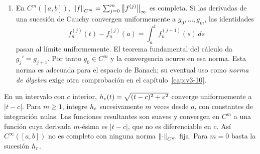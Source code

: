\begin{enumerate}
\item En $C^m([a,b])$, $\left\lVert f\right\rVert_{C^m}=\sum_{j=0}^m\left\lVert f^{(j)}\right\rVert_\infty$ es completa. Si las derivadas de una sucesión de Cauchy convergen uniformemente a $g_0,\ldots,g_m$, las identidades
\[
 f_n^{(j)}(t)-f_n^{(j)}(a)=\int_a^t f_n^{(j+1)}(s)\,ds
\]
pasan al límite uniformemente. El teorema fundamental del cálculo da $g_j'=g_{j+1}$. Por tanto $g_0\in C^m$ y la convergencia ocurre en esa norma. Esta norma es adecuada para el espacio de Banach; su eventual uso como \emph{norma de álgebra} exige otra comprobación en el capítulo~\ref{cap:v3-10}.
\end{enumerate}
\begin{ejemplo}
En un intervalo con $c$ interior, $h_\varepsilon(t)=\sqrt{(t-c)^2+\varepsilon^2}$ converge uniformemente a $|t-c|$. Para $m\geq1$, integre $h_\varepsilon$ sucesivamente $m$ veces desde $a$, con constantes de integración nulas. Las funciones resultantes son suaves y convergen en $C^m$ a una función cuya derivada $m$-ésima es $|t-c|$, que no es diferenciable en $c$. Así $C^\infty([a,b])$ no es completo con ninguna norma $\left\lVert\cdot\right\rVert_{C^m}$ fija. Para $m=0$ basta la sucesión $h_\varepsilon$.
\end{ejemplo}

